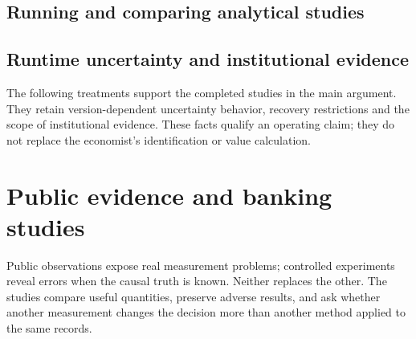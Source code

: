 \documentclass[11pt,a4paper,openany]{book}
\begin{document}
\chapter{Running and comparing analytical studies}









\chapter{Runtime uncertainty and institutional evidence}
The following treatments support the completed studies in the main argument.
They retain version-dependent uncertainty behavior, recovery restrictions
and the scope of institutional evidence. These facts qualify an operating
claim; they do not replace the economist's identification or value calculation.



\part{Public evidence and banking studies}
\label{reading:part-evidence}
Public observations expose real measurement problems; controlled
experiments reveal errors when the causal truth is known. Neither replaces
the other. The studies compare useful quantities, preserve adverse results,
and ask whether another measurement changes the decision more than another
method applied to the same records.
\end{document}
